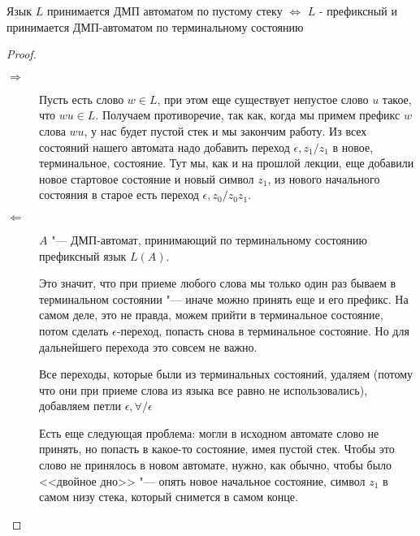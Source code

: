 \begin{theorem}
Язык $L$ принимается ДМП автоматом по пустому стеку $\Leftrightarrow$ $L$ - префиксный и принимается ДМП-автоматом по терминальному состоянию
\end{theorem}
\begin{proof}
\begin{description}
    \item[$\Rightarrow$]

Пусть есть слово $w \in L$, при этом еще существует непустое слово $u$ такое, что $wu \in L$.
Получаем противоречие, так как, когда мы примем префикс $w$ слова $wu$, у нас будет пустой стек и мы закончим работу.
Из всех состояний нашего автомата надо добавить переход $\epsilon, z_1/z_1$ в новое, терминальное, состояние. 
Тут мы, как и на прошлой лекции, еще добавили новое стартовое состояние и новый символ $z_1$, из нового начального состояния в старое есть переход $\epsilon, z_0/z_0z_1$.

\item[$\Leftarrow$]
$A$ "--- ДМП-автомат, принимающий по терминальному состоянию префиксный язык $L(A)$.

Это значит, что при приеме любого слова мы только один раз бываем в терминальном состоянии "--- иначе можно принять еще и его префикс.
На самом деле, это не правда, можем прийти в терминальное состояние, потом сделать $\epsilon$-переход, попасть снова в терминальное состояние. 
Но для дальнейшего перехода это совсем не важно.

Все переходы, которые были из терминальных состояний, удаляем (потому что они при приеме слова из языка все равно не использовались), добавляем петли $\epsilon, \forall/\epsilon$

Есть еще следующая проблема: могли в исходном автомате слово не принять, но попасть в какое-то состояние, имея пустой стек. 
Чтобы это слово не принялось в новом автомате, нужно, как обычно, чтобы было <<двойное дно>> "--- опять новое начальное состояние, символ $z_1$ в самом низу стека, который снимется в самом конце.
\end{description}
\end{proof}

